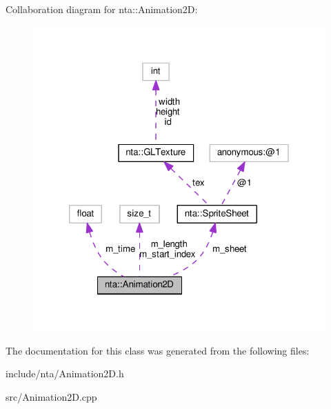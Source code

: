 Collaboration diagram for nta\+:\+:Animation2D\+:\nopagebreak
\begin{figure}[H]
\begin{center}
\leavevmode
\includegraphics[width=320pt]{db/d21/classnta_1_1Animation2D__coll__graph}
\end{center}
\end{figure}


The documentation for this class was generated from the following files\+:\begin{DoxyCompactItemize}
\item 
include/nta/Animation2\+D.\+h\item 
src/Animation2\+D.\+cpp\end{DoxyCompactItemize}
